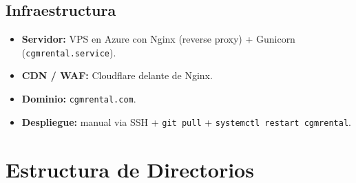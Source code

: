 \documentclass[11pt,a4paper]{article}
\begin{document}
\subsection{Infraestructura}

\begin{itemize}[leftmargin=*]
    \item \textbf{Servidor:} VPS en Azure con Nginx (reverse proxy) +
        Gunicorn (\texttt{cgmrental.service}).
    \item \textbf{CDN / WAF:} Cloudflare delante de Nginx.
    \item \textbf{Dominio:} \texttt{cgmrental.com}.
    \item \textbf{Despliegue:} manual via SSH + \texttt{git pull} +
        \texttt{systemctl restart cgmrental}.
\end{itemize}

\section{Estructura de Directorios}
\end{document}

